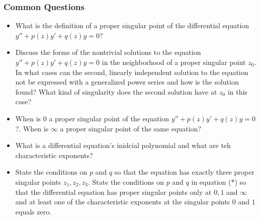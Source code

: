 \documentclass[11pt, a4paper]{article}
\begin{document}
\subsubsection{Common Questions}
\begin{itemize}
	\item What is the definition of a proper singular point of the differential equation $ y'' + p(z)y' + q(z)y = 0 $?
		
	\item Discuss the forms of the nontrivial solutions to the equation $ y'' + p(z)y' + q(z)y = 0 $ in the neighborhood of a proper singular point $ z_0 $. In what cases can the second, linearly independent solution to the equation not be expressed with a generalized power series and how is the solution found? What kind of singularity does the second solution have at $ z_0 $ in this case? 
	
	\item When is $ 0 $ a proper singular point of the equation $ y'' + p(z)y' + q(z)y = 0  $?. When is $ \infty $ a proper singular point of the same equation?
	
	\item What is a differential equation's inidcial polynomial and what are teh characteristic exponents?

	\item State the conditions on $ p $ and $ q $ so that the equation has exactly three proper singular points $ z_{1}, z_2, z_3 $. State the conditions on $ p $ and $ q $ in equation (*) so that the differential equation has proper singular points only at $ 0, 1 $ and $ \infty $ and at least one of the characteristic exponents at the singular points $ 0 $ and $ 1 $ equals zero.
\end{itemize}
\end{document}
